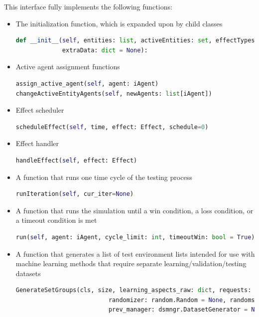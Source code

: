 \documentclass[masterthesis]{fer}
\begin{document}
This interface fully implements the following functions:
\begin{itemize}
\item{The initialization function, which is expanded upon by child classes}
\begin{lstlisting}[language=Python]
def __init__(self, entities: list, activeEntities: set, effectTypes: list[Effect], effects: list[EffectTime],
             extraData: dict = None):
\end{lstlisting}
\item{Active agent assignment functions}
\begin{lstlisting}[language=Python]
assign_active_agent(self, agent: iAgent)
changeActiveEntityAgents(self, newAgents: list[iAgent])
\end{lstlisting}
 
\item{Effect scheduler}

\begin{lstlisting}[language=Python]
scheduleEffect(self, time, effect: Effect, schedule=0)
\end{lstlisting}

\item{Effect handler}

\begin{lstlisting}[language=Python]
handleEffect(self, effect: Effect)
\end{lstlisting}

\item{A function that runs one time cycle of the testing process}

\begin{lstlisting}[language=Python]
runIteration(self, cur_iter=None)
\end{lstlisting}

\item{A function that runs the simulation until a win condition, a loss condition, or a timeout condition is met}

\begin{lstlisting}[language=Python]
run(self, agent: iAgent, cycle_limit: int, timeoutWin: bool = True) -> tuple[bool, int]
\end{lstlisting}

\item{A function that generates a list of test environment lists intended for use with machine learning methods that require separate learning/validation/testing datasets}

\begin{lstlisting}[language=Python]
GenerateSetGroups(cls, size, learning_aspects_raw: dict, requests: dict, ratio=None, *args,
                          randomizer: random.Random = None, randomseed=42,
                          prev_manager: dsmngr.DatasetGenerator = None, **kwargs) -> list[list['iEnvironment']]
\end{lstlisting}

\end{itemize}
\end{document}
